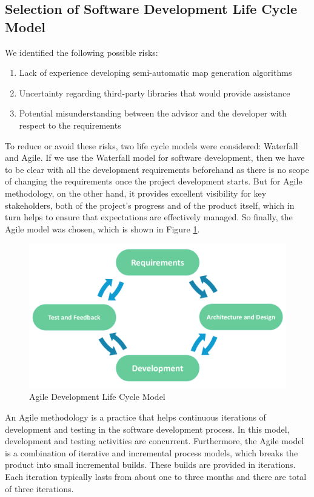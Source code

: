 \subsection{Selection of Software Development Life Cycle Model}
\label{sec:Requirements>SDLC}
We identified the following possible risks:
\begin{enumerate}
  \item Lack of experience developing semi-automatic map generation algorithms
  \item Uncertainty regarding third-party libraries that would provide assistance
  \item Potential misunderstanding between the advisor and the developer with respect to the requirements
\end{enumerate}

To reduce or avoid these risks, two life cycle models were considered: Waterfall and Agile. If we use the Waterfall model for software development, then we have to be clear with all the development requirements beforehand as there is no scope of changing the requirements once the project development starts. But for Agile methodology, on the other hand, it provides excellent visibility for key stakeholders, both of the project’s progress and of the product itself, which in turn helps to ensure that expectations are effectively managed. So finally, the Agile model was chosen, which is shown in Figure \ref{fig:Agile Model}.

\begin{figure}[htb]
\centering
\includegraphics[width=\textwidth]{section02/assets/Agile.png}
\caption[Agile Development Life Cycle Model]{\label{fig:Agile Model}Agile Development Life Cycle Model \cite{web:AgileModel}}
\end{figure}

An Agile methodology is a practice that helps continuous iterations of development and testing in the software development process. In this model, development and testing activities are concurrent. Furthermore, the Agile model is a combination of iterative and incremental process models, which breaks the product into small incremental builds. These builds are provided in iterations. Each iteration typically lasts from about one to three months and there are total of three iterations.

